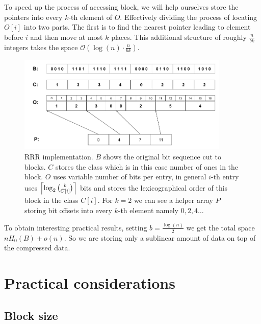 To speed up the process of accessing block, we will help ourselves store the pointers
into every $k$-th element of $O$. Effectively dividing the process of locating $O[i]$ into two
parts. The first is to find the nearest pointer leading to element before $i$ and
then move at most $k$ places. This additional structure of roughly $\frac{n}{bk}$ integers
takes the space $\mathcal{O}(\log(n)\cdot \frac{n}{bk})$.

\begin{figure}
	\centerline{
		\includegraphics[width=0.9\textwidth, height=0.3\textheight]{images/rrr}
	}
	\caption[TODO]{RRR implementation. $B$ shows the original bit sequence cut to
    blocks. $C$ stores the class which is in this case number of ones in the block.
    $O$ uses variable number of bits per entry, in general $i$-th entry uses
    $\left\lceil \log_2{b\choose C[i]} \right\rceil$ bits and stores the lexicographical order
    of this block in the class $C[i]$. For $k=2$ we can see a helper array $P$
    storing bit offsets into every $k$-th element namely $0, 2, 4\ldots$
	}
	\label{obr:RRRFinal}
\end{figure}

To obtain interesting practical results, setting $b=\frac{\log(n)}{2}$ we get the total space
$nH_0(B) + o(n)$. So we are storing only a sublinear amount of data on top of the compressed
data.

\section{Practical considerations}

\subsection{Block size}

